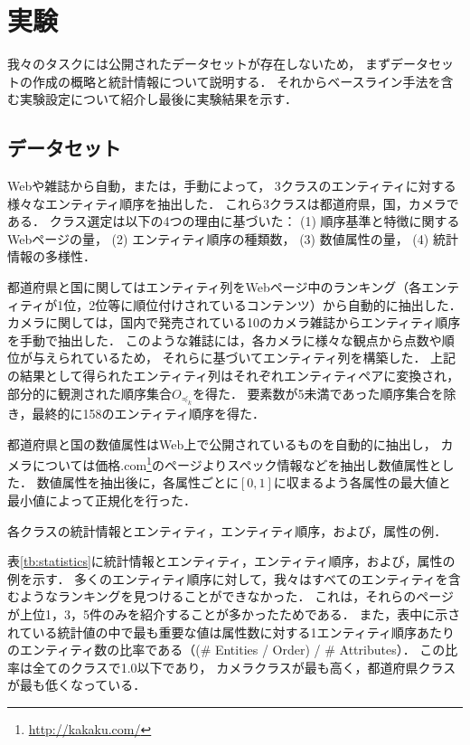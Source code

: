 \chapter{実験}
\label{sq:Experiments}

我々のタスクには公開されたデータセットが存在しないため，
まずデータセットの作成の概略と統計情報について説明する．
それからベースライン手法を含む実験設定について紹介し最後に実験結果を示す．

\section{データセット}

Webや雑誌から自動，または，手動によって，
3クラスのエンティティに対する様々なエンティティ順序を抽出した．
これら3クラスは都道府県，国，カメラである．
クラス選定は以下の4つの理由に基づいた：
(1) 順序基準と特徴に関するWebページの量，
(2) エンティティ順序の種類数，
(3) 数値属性の量，
(4) 統計情報の多様性．

都道府県と国に関してはエンティティ列をWebページ中のランキング（各エンティティが1位，2位等に順位付けされているコンテンツ）から自動的に抽出した．
カメラに関しては，国内で発売されている10のカメラ雑誌からエンティティ順序を手動で抽出した．
このような雑誌には，各カメラに様々な観点から点数や順位が与えられているため，
それらに基づいてエンティティ列を構築した．
上記の結果として得られたエンティティ列はそれぞれエンティティペアに変換され，
部分的に観測された順序集合$O_{\preceq_{k}}$を得た．
要素数が5未満であった順序集合を除き，最終的に158のエンティティ順序を得た．

都道府県と国の数値属性はWeb上で公開されているものを自動的に抽出し，
カメラについては価格.com\footnote{\url{http://kakaku.com/}}のページよりスペック情報などを抽出し数値属性とした．
数値属性を抽出後に，各属性ごとに$[0, 1]$に収まるよう各属性の最大値と最小値によって正規化を行った．

\begin{table}[t]
\centering
\caption{各クラスの統計情報とエンティティ，エンティティ順序，および，属性の例．}

\label{tb:statistics}
\end{table}

表\ref{tb:statistics}に統計情報とエンティティ，エンティティ順序，および，属性の例を示す．
多くのエンティティ順序に対して，我々はすべてのエンティティを含むようなランキングを見つけることができなかった．
これは，それらのページが上位1，3，5件のみを紹介することが多かったためである．
また，表中に示されている統計値の中で最も重要な値は属性数に対する1エンティティ順序あたりのエンティティ数の比率である（(\# Entities / Order) / \# Attributes）．
この比率は全てのクラスで1.0以下であり，
カメラクラスが最も高く，都道府県クラスが最も低くなっている．

